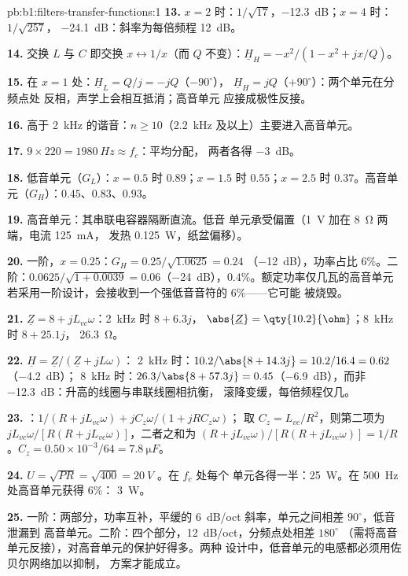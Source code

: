 \begin{solution}{pb:b1:filters-transfer-functions:1}
\textbf{13.} $x = 2$ 时：$1/\sqrt{17}$，\qty{-12.3}{dB}；$x = 4$ 时：$1/\sqrt{257}$，
\qty{-24.1}{dB}：斜率为每倍频程 \qty{12}{dB}。

\textbf{14.} 交换 $L$ 与 $C$ 即交换 $x \leftrightarrow 1/x$（而
$Q$ 不变）：$\underline H_H = -x^2/(1 - x^2 + jx/Q)$。

\textbf{15.} 在 $x = 1$ 处：$\underline H_L = Q/j = -jQ$（$-90^\circ$），
$\underline H_H = jQ$（$+90^\circ$）：两个单元在分频点处
反相，声学上会相互抵消；高音单元
应接成极性反接。

\textbf{16.} 高于 \qty{2}{kHz} 的谐音：$n \geq 10$（\qty{2.2}{kHz}
及以上）主要进入高音单元。

\textbf{17.} $9 \times 220 = \qty{1980}{Hz} \approx f_c$：平均分配，
两者各得 \qty{-3}{dB}。

\textbf{18.} 低音单元（$G_L$）：$x = 0.5$ 时 $0.89$；$x = 1.5$ 时 $0.55$；$x = 2.5$ 时
$0.37$。高音单元（$G_H$）：$0.45$、$0.83$、$0.93$。

\textbf{19.} 高音单元：其串联电容器隔断直流。低音
单元承受偏置（\qty{1}{V} 加在 \qty{8}{\ohm} 两端，电流 \qty{125}{mA}，
发热 \qty{0.125}{W}，纸盆偏移）。

\textbf{20.} 一阶，$x = 0.25$：$G_H = 0.25/\sqrt{1.0625} = 0.24$
（\qty{-12}{dB}），功率占比 $6\%$。二阶：$0.0625/\sqrt{1 +
0.0039} = 0.06$（\qty{-24}{dB}），$0.4\%$。额定功率仅几瓦的高音单元
若采用一阶设计，会接收到一个强低音音符的 $6\%$——它可能
被烧毁。

\textbf{21.} $\underline Z = 8 + jL_{vc}\omega$：\qty{2}{kHz} 时 $8 + 6.3j$，
$\abs{\underline Z} = \qty{10.2}{\ohm}$；\qty{8}{kHz} 时 $8 + 25.1j$，
\qty{26.3}{\ohm}。

\textbf{22.} $\underline H = \underline Z/(\underline Z + jL\omega)$：
\qty{2}{kHz} 时：$10.2/\abs{8 + 14.3j} = 10.2/16.4 = 0.62$（\qty{-4.2}{dB}）；
\qty{8}{kHz} 时：$26.3/\abs{8 + 57.3j} = 0.45$（\qty{-6.9}{dB}），而非
\qty{-12.3}{dB}：升高的线圈与串联线圈相抗衡，
滚降变缓，每倍频程仅几。

\textbf{23.} ：$1/(R + jL_{vc}\omega) + jC_z\omega/(1 + jRC_z\omega)$；
取 $C_z = L_{vc}/R^2$，则第二项为 $jL_{vc}\omega/[R(R +
jL_{vc}\omega)]$，二者之和为 $(R + jL_{vc}\omega)/[R(R + jL_{vc}\omega)]
= 1/R$。$C_z = 0.50\times10^{-3}/64 = \qty{7.8}{\micro F}$。

\textbf{24.} $U = \sqrt{PR} = \sqrt{400} = \qty{20}{V}$ 。在 $f_c$ 处每个
单元各得一半：\qty{25}{W}。在 \qty{500}{Hz} 处高音单元获得 $6\%$：
\qty{3}{W}。

\textbf{25.} 一阶：两部分，功率互补，平缓的
\qty{6}{dB/oct} 斜率，单元之间相差 $90^\circ$，低音泄漏到
高音单元。二阶：四个部分，\qty{12}{dB/oct}，分频点处相差 $180^\circ$
（需将高音单元反接），对高音单元的保护好得多。两种
设计中，低音单元的电感都必须用佐贝尔网络加以抑制，
方案才能成立。
\end{solution}
